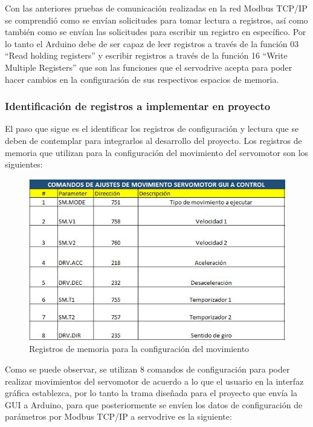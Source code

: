 \documentclass[12pt,titlepage]{article}
\begin{document}
Con las anteriores pruebas de comunicación realizadas en la red Modbus TCP/IP se comprendió como se envían solicitudes para tomar lectura a registros, así como también como se envían las solicitudes para escribir un registro en específico. Por lo tanto el Arduino debe de ser capaz de leer registros a través de la función 03 ``Read holding registers'' y escribir registros a través de la función 16 ``Write Multiple Registers''  que son las funciones que el servodrive acepta para poder hacer cambios en la configuración de sus respectivos espacios de memoria. \\ 

\newpage
\subsubsection{Identificación de registros a implementar en proyecto}
El paso que sigue es el identificar los registros de configuración y lectura que se deben de contemplar para integrarlos al desarrollo del proyecto. Los registros de memoria que utilizan para la configuración del movimiento del servomotor son los siguientes: \\ 

 \begin{figure}[htbp]
\hspace*{1.9cm} 
\includegraphics[scale=0.75]{registros_ajustes}
\caption{Registros de memoria para la configuración del movimiento}
\end{figure}

Como se puede observar, se utilizan 8 comandos de configuración para poder realizar movimientos del servomotor de acuerdo a lo que el usuario en la interfaz gráfica establezca, por lo tanto la trama diseñada para el proyecto que envía la GUI a Arduino, para que posteriormente se envíen los datos de configuración de parámetros por Modbus TCP/IP a servodrive es la siguiente: \\
\end{document}
